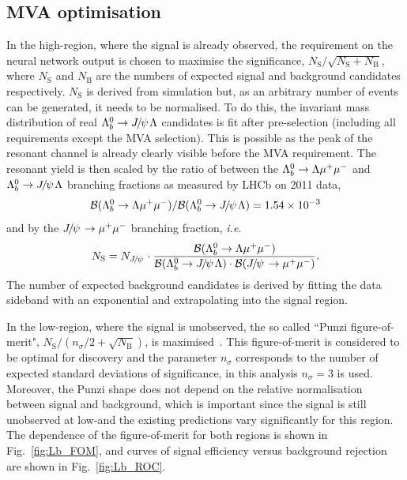 







\subsection{MVA optimisation}
\label{sec:Lb_mva_opt}

In the high-\qsq region, where the signal is already observed, the requirement on the neural network output
is chosen to maximise the significance, $N_{\mathrm{S}}/\sqrt{N_{\mathrm{S}}+N_{\mathrm{B}}}$, where
$N_\mathrm{S}$ and $N_\mathrm{B}$ are the numbers of expected signal and background candidates respectively.
$N_\mathrm{S}$ is derived from simulation but, as an arbitrary number of events can be generated, it
needs to be normalised. To do this, the invariant mass distribution of real $\Lb\to\jpsi\Lz$ candidates
is fit after pre-selection (including all requirements except the MVA selection). This is possible as the peak of the resonant
channel is already clearly visible before the MVA requirement. The resonant yield is then scaled by the ratio
of between the ${{\Lambda}^0_{b}}\rightarrow{\ensuremath{\Lambda}}{\ensuremath{\mu^+\mu^-}}$ and $\Lb\to\jpsi\Lz$ branching fractions as measured 
by LHCb on 2011 data, 
\begin{equation}
\BR(\Lb\to\Lz\mumu) / \BR(\Lb\to\jpsi\Lz) =  1.54 \times 10^{-3}
\end{equation}
\noindent
and by the $\jpsi\to\mumu$ branching fraction, \emph{i.e.}
\begin{equation}
N_\mathrm{S} = N_\jpsi \cdot \frac{\BR(\Lb\to\Lz\mumu)}{\BR(\Lb\to\jpsi\Lz) \cdot \BR(\jpsi\to\mumu) }.
\end{equation}
%
The number of expected background candidates is derived by fitting the data
sideband with an exponential and extrapolating into the signal region.

In the low-\qsq region, where the signal is unobserved, the so called ``Punzi figure-of-merit",
$N_{\mathrm{S}}/(n_\sigma/2+\sqrt{N_{\mathrm{B}}})$, is maximised~\cite{Punzi:2003bu}.
This figure-of-merit is considered to be optimal for discovery and the parameter $n_\sigma$ corresponds to
the number of expected standard deviations of significance, in this analysis $n_\sigma = 3$ is used.
Moreover, the Punzi shape does not depend on the relative normalisation between signal and background, which
is important since the signal is still unobserved at low-\qsq and the existing predictions vary significantly
for this region. The dependence of the figure-of-merit for both \qsq regions is shown in Fig.~\ref{fig:Lb_FOM}, and curves
of signal efficiency versus background rejection are shown in Fig.~\ref{fig:Lb_ROC}.

